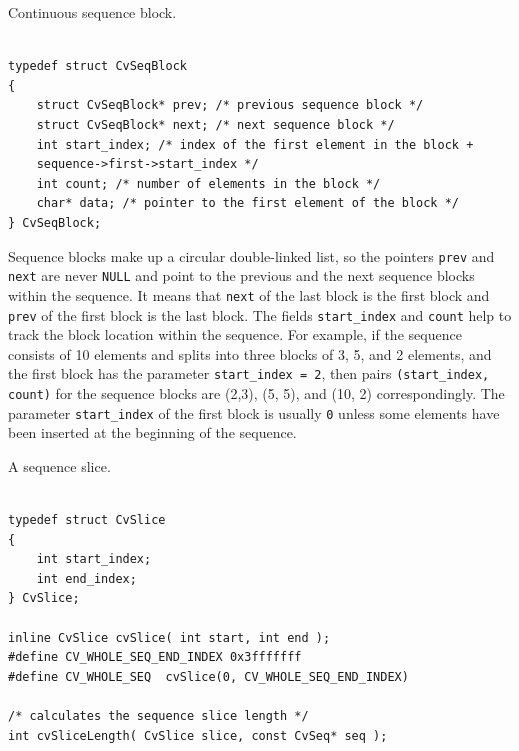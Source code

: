 \label{CvSeqBlock}

Continuous sequence block.

\begin{lstlisting}

typedef struct CvSeqBlock
{
    struct CvSeqBlock* prev; /* previous sequence block */
    struct CvSeqBlock* next; /* next sequence block */
    int start_index; /* index of the first element in the block +
    sequence->first->start_index */
    int count; /* number of elements in the block */
    char* data; /* pointer to the first element of the block */
} CvSeqBlock;

\end{lstlisting}

Sequence blocks make up a circular double-linked list, so the pointers
\texttt{prev} and \texttt{next} are never \texttt{NULL} and point to the
previous and the next sequence blocks within the sequence. It means that
\texttt{next} of the last block is the first block and \texttt{prev} of
the first block is the last block. The fields \texttt{start\_index} and
\texttt{count} help to track the block location within the sequence. For
example, if the sequence consists of 10 elements and splits into three
blocks of 3, 5, and 2 elements, and the first block has the parameter
\texttt{start\_index = 2}, then pairs \texttt{(start\_index, count)} for the sequence
blocks are
(2,3), (5, 5), and (10, 2)
correspondingly. The parameter
\texttt{start\_index} of the first block is usually \texttt{0} unless
some elements have been inserted at the beginning of the sequence.

\label{CvSlice}

A sequence slice.

\begin{lstlisting}

typedef struct CvSlice
{
    int start_index;
    int end_index;
} CvSlice;

inline CvSlice cvSlice( int start, int end );
#define CV_WHOLE_SEQ_END_INDEX 0x3fffffff
#define CV_WHOLE_SEQ  cvSlice(0, CV_WHOLE_SEQ_END_INDEX)

/* calculates the sequence slice length */
int cvSliceLength( CvSlice slice, const CvSeq* seq );

\end{lstlisting}

